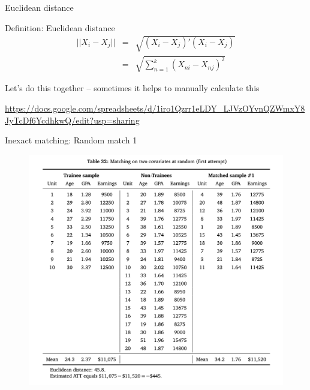 \documentclass{beamer}
\newcommand*\colvec[1]{\begin{pmatrix}#1\end{pmatrix}}
\begin{document}
	

\begin{frame}{Euclidean distance}
	\begin{block}{Definition: Euclidean distance}
    \vspace*{-2.5mm}
    \begin{eqnarray*}
    ||X_i-X_j|| &=& \sqrt{ (X_i-X_j)'(X_i-X_j) } \\
    &=& \sqrt{ \sum_{n=1}^k (X_{ni} - X_{nj})^2 }
    \end{eqnarray*}
    \vspace*{-2.5mm}
	\end{block}
	
Let's do this together -- sometimes it helps to manually calculate this

\bigskip

\url{https://docs.google.com/spreadsheets/d/1iro1Qzrr1eLDY_LJVzOYvnQZWmxY8JyTcDf6YcdhkwQ/edit?usp=sharing}

	
\end{frame}


\begin{frame}{Inexact matching: Random match 1}

\begin{figure}[!t]\centering
\includegraphics[scale=0.45]{./lecture_includes/inexact_random1}
\end{figure}

\end{frame}
\end{document}
